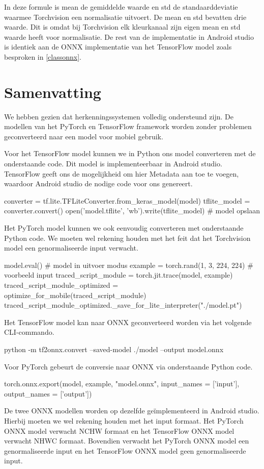 In deze formule is mean de gemiddelde waarde en std de standaarddeviatie waarmee Torchvision een normalisatie uitvoert.
De mean en std bevatten drie waarde.
Dit is omdat bij Torchvision elk kleurkanaal zijn eigen mean en std waarde heeft voor normalisatie.
De rest van de implementatie in Android studio is identiek aan de ONNX implementatie van het TensorFlow model zoals besproken in \ref{classonnx}. 

\section{Samenvatting}
We hebben gezien dat herkenningssystemen volledig ondersteund zijn.
De modellen van het PyTorch en TensorFlow framework worden zonder problemen geconverteerd naar een model voor mobiel gebruik.

Voor het TensorFlow model kunnen we in Python ons model converteren met de onderstaande code.
Dit model is implementeerbaar in Android studio.
TensorFlow geeft ons de mogelijkheid om hier Metadata aan toe te voegen, waardoor Android studio de nodige code voor ons genereert.

\begin{python}
    converter = tf.lite.TFLiteConverter.from_keras_model(model)
    tflite_model = converter.convert()
    open('model.tflite', 'wb').write(tflite_model) # model opslaan
\end{python}

Het PyTorch model kunnen we ook eenvoudig converteren met onderstaande Python code.
We moeten wel rekening houden met het feit dat het Torchvision model een genormaliseerde input verwacht.

\begin{python}
model.eval() # model in uitvoer modus
example = torch.rand(1, 3, 224, 224) # voorbeeld input
traced_script_module = torch.jit.trace(model, example) 
traced_script_module_optimized = optimize_for_mobile(traced_script_module)
traced_script_module_optimized._save_for_lite_interpreter("./model.pt") 
\end{python}

Het TensorFlow model kan naar ONNX geconverteerd worden via het volgende CLI-commando.

\begin{python}
python -m tf2onnx.convert --saved-model ./model --output model.onnx
\end{python}

Voor PyTorch gebeurt de conversie naar ONNX via onderstaande Python code.

\begin{python}
torch.onnx.export(model, example, "model.onnx",
        input_names = ['input'], output_names = ['output'])    
\end{python}

De twee ONNX modellen worden op dezelfde ge\"implementeerd in Android studio.
Hierbij moeten we wel rekening houden met het input formaat.
Het PyTorch ONNX model verwacht NCHW formaat en het TensorFlow ONNX model verwacht NHWC formaat.
Bovendien verwacht het PyTorch ONNX model een genormaliseerde input en het TensorFlow ONNX model geen genormaliseerde input.